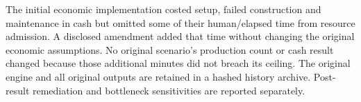 The initial economic implementation costed setup, failed construction and maintenance in cash but omitted some of their human/elapsed time from resource admission. A disclosed amendment added that time without changing the original economic assumptions. No original scenario's production count or cash result changed because those additional minutes did not breach its ceiling. The original engine and all original outputs are retained in a hashed history archive. Post-result remediation and bottleneck sensitivities are reported separately.
